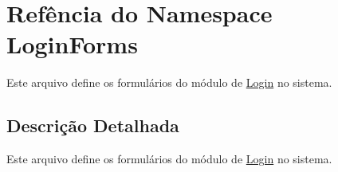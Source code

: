 \hypertarget{namespaceLoginForms}{\section{Refência do Namespace Login\-Forms}
\label{namespaceLoginForms}
}


Este arquivo define os formulários do módulo de \hyperlink{namespaceLogin}{Login} no sistema.  




\subsection{Descrição Detalhada}
Este arquivo define os formulários do módulo de \hyperlink{namespaceLogin}{Login} no sistema. 